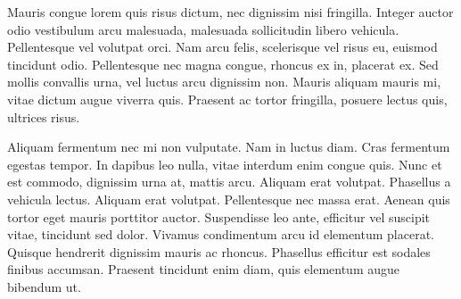 \documentclass[
twoside,
a4paper,
10pt,
english,
notikzsans,
final,
]{dpse}
\begin{document}
Mauris congue lorem quis risus dictum, nec dignissim nisi fringilla. Integer auctor odio vestibulum arcu malesuada, malesuada sollicitudin libero vehicula. Pellentesque vel volutpat orci. Nam arcu felis, scelerisque vel risus eu, euismod tincidunt odio. Pellentesque nec magna congue, rhoncus ex in, placerat ex. Sed mollis convallis urna, vel luctus arcu dignissim non. Mauris aliquam mauris mi, vitae dictum augue viverra quis. Praesent ac tortor fringilla, posuere lectus quis, ultrices risus.

Aliquam fermentum nec mi non vulputate. Nam in luctus diam. Cras fermentum egestas tempor. In dapibus leo nulla, vitae interdum enim congue quis. Nunc et est commodo, dignissim urna at, mattis arcu. Aliquam erat volutpat. Phasellus a vehicula lectus. Aliquam erat volutpat. Pellentesque nec massa erat. Aenean quis tortor eget mauris porttitor auctor. Suspendisse leo ante, efficitur vel suscipit vitae, tincidunt sed dolor. Vivamus condimentum arcu id elementum placerat. Quisque hendrerit dignissim mauris ac rhoncus. Phasellus efficitur est sodales finibus accumsan. Praesent tincidunt enim diam, quis elementum augue bibendum ut.

\appendix

\backmatter

\printbibliography

\clearpage
\indexintoc
\twocolindex
\printindex

\glsaddallunused

\makebackcover
\end{document}
